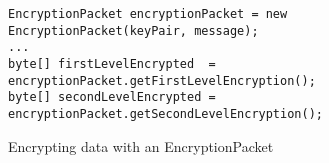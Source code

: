 \begin{figure}[H]
  \centering
  \begin{verbatim}
EncryptionPacket encryptionPacket = new EncryptionPacket(keyPair, message);
...
byte[] firstLevelEncrypted  = encryptionPacket.getFirstLevelEncryption();
byte[] secondLevelEncrypted = encryptionPacket.getSecondLevelEncryption();
  \end{verbatim}
  \caption{Encrypting data with an EncryptionPacket}
  \label{code:encryption_packet_encryption}
\end{figure}
